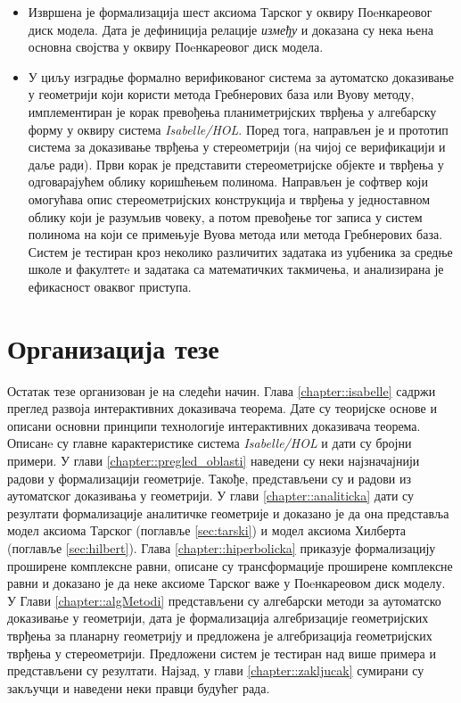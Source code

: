 \begin{itemize}
\item Извршена је формализација шест аксиома Тарског у оквиру
  Поeнкареовог диск модела. Дата је дефиниција релације \emph{између}
  и доказана су нека њена основна својства у оквиру Поeнкареовог диск
  модела.

\item У циљу изградње формално верификованог система за аутоматско
  доказивање у геометрији који користи метода Гребнерових база или
  Вуову методу, имплементиран је корак превођења планиметријских
  тврђења у алгебарску форму у оквиру система \emph{Isabelle/HOL}.
  Поред тога, направљен је и прототип система за доказивање тврђења у
  стереометрији (на чијој се верификацији и даље ради). Први корак је
  представити стереометријске објекте и тврђења у одговарајућем облику
  коришћењем полинома. Направљен је софтвер који омогућава опис
  стереометријских конструкција и тврђења у једноставном облику који
  је разумљив човеку, а потом превођење тог записа у систем полинома
  на који се примењује Вуова метода или метода Гребнерових
  база. Систем је тестиран кроз неколико различитих задатака из
  уџбеника за средње школе и факултетe и задатака са математичких
  такмичења, и анализирана је ефикасност оваквог приступа.
\end{itemize}


\section{Организација тезе}

Остатак тезе организован је на следећи начин. Глава
\ref{chapter::isabelle} садржи преглед развоја интерактивних
доказивача теорема. Дате су теоријске основе и описани основни
принципи технологије интерактивних доказивача теорема. Описанe су
главне карактеристике система \emph{Isabelle/HOL} и дати су бројни
примери. У глави \ref{chapter::pregled_oblasti} наведени су неки
најзначајнији радови у формализацији геометрије. Такође, представљени
су и радови из аутоматског доказивања у геометрији. У глави
\ref{chapter::analiticka} дати су резултати формализације аналитичке
геометрије и доказано је да она представља модел аксиома Тарског
(поглавље \ref{sec:tarski}) и модел аксиома Хилберта (поглавље
\ref{sec:hilbert}). Глава \ref{chapter::hiperbolicka} приказује
формализацију проширене комплексне равни, описане су трансформације
проширене комплексне равни и доказано је да неке аксиоме Тарског важе
у Поeнкареовом диск моделу. У Глави \ref{chapter::algMetodi}
представљени су алгебарски методи за аутоматско доказивање у
геометрији, дата је формализација алгебризације геометријских тврђења
за планарну геометрију и предложена је алгебризација геометријских
тврђења у стереометрији. Предложени систем је тестиран над више
примера и представљени су резултати. Најзад, у глави
\ref{chapter::zakljucak} сумирани су закључци и наведени неки правци
будућег рада.
